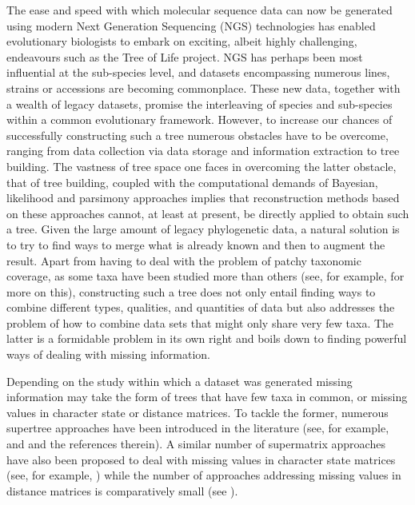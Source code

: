 The ease and speed with which molecular sequence data can now be generated
using modern Next Generation Sequencing (NGS) technologies has enabled
evolutionary biologists to embark on exciting, albeit highly challenging,
endeavours such as the Tree of Life project. NGS has perhaps been most
influential at the sub-species level, and datasets encompassing numerous
lines, strains or accessions are becoming commonplace. These new data,
together with a wealth of legacy datasets, promise the interleaving of species
and sub-species within a common evolutionary framework.  However, to increase
our chances of successfully constructing such a tree numerous obstacles have
to be overcome, ranging from data collection via data storage and information
extraction to tree building. The vastness of tree space one faces in
overcoming the latter obstacle, that of tree building, coupled with the
computational demands of Bayesian, likelihood and parsimony approaches implies
that reconstruction methods based on these approaches cannot, at least at
present, be directly applied to obtain such a tree. Given the large amount of
legacy phylogenetic data, a natural solution is to try to find ways to merge
what is already known and then to augment the result. Apart from having to
deal with the problem of patchy taxonomic coverage, as some taxa have been
studied more than others (see, for example,
\cite{sanderson10phylogenomics,philippe2004phylogenomics,steel10characterizing,roure12impact}
for more on this), constructing such a tree does not only entail finding ways
to combine different types, qualities, and quantities of data but also
addresses the problem of how to combine data sets that might only share very
few taxa. The latter is a formidable problem in its own right and boils down
to finding powerful ways of dealing with missing information.

Depending on the study within which a dataset was generated missing
information may take the form of trees that have few taxa in common, or
missing values in character state or distance matrices.  To tackle the former,
numerous supertree approaches have been introduced in the literature (see, for
example, \cite{bininda04phylogenetic} and \cite{brinkmeyer13flipcut} and the
references therein).  A similar number of supermatrix approaches have also
been proposed to deal with missing values in character state matrices (see,
for example, \cite{bininda04phylogenetic}) while the number of approaches
addressing missing values in distance matrices is comparatively small (see
\cite{criscuolo2006sdm,criscuolo2008fastnj,makarenkov2001nouvelle,guenoche1999approximations,guenoche2004extension,de1984ultrametric,gaul1994pyramidal}).

